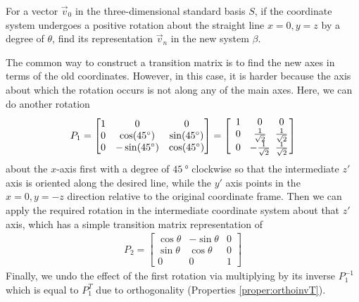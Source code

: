 \begin{exmp}
\label{ex:rotateyz}
For a vector $\vec{v}_0$ in the three-dimensional standard basis $S$, if the coordinate system undergoes a positive rotation about the straight line $x = 0, y = z$ by a degree of $\theta$, find its representation $\vec{v}_n$ in the new system $\beta$.
\end{exmp}
\begin{solution}
The common way to construct a transition matrix is to find the new axes in terms of the old coordinates. However, in this case, it is harder because the axis about which the rotation occurs is not along any of the main axes. Here, we can do another rotation 
\begin{align*}
P_1 = 
\begin{bmatrix}
1 & 0 & 0 \\
0 & \cos(\SI{45}{\degree}) & \sin(\SI{45}{\degree}) \\
0 & -\sin(\SI{45}{\degree}) & \cos(\SI{45}{\degree})
\end{bmatrix}
=
\left[\begin{array}{@{\,}wc{12pt}wc{12pt}wc{12pt}@{\,}}
1 & 0 & 0 \\
0 & \frac{1}{\sqrt{2}} & \frac{1}{\sqrt{2}} \\
0 & -\frac{1}{\sqrt{2}} & \frac{1}{\sqrt{2}}
\end{array}\right]
\end{align*}
about the $x$-axis first with a degree of $\SI{45}{\degree}$ clockwise so that the intermediate $z'$ axis is oriented along the desired line, while the $y'$ axis points in the $x = 0, y = -z$ direction relative to the original coordinate frame. Then we can apply the required rotation in the intermediate coordinate system about that $z'$ axis, which has a simple transition matrix representation of
\begin{align*}
P_2 =
\begin{bmatrix}
\cos \theta & -\sin \theta & 0 \\
\sin \theta & \cos \theta & 0 \\
0 & 0 & 1
\end{bmatrix}
\end{align*}
Finally, we undo the effect of the first rotation via multiplying by its inverse $P_1^{-1}$ which is equal to $P_1^T$ due to orthogonality (Properties \ref{proper:orthoinvT}). 
\begin{figure}[ht!]
\centering
\begin{tikzpicture}[x={(-0.4cm, -0.9cm)}, y={(1cm, 0cm)}, z={(0cm, 1cm)}]

\end{tikzpicture}
\end{figure}
\end{solution}
